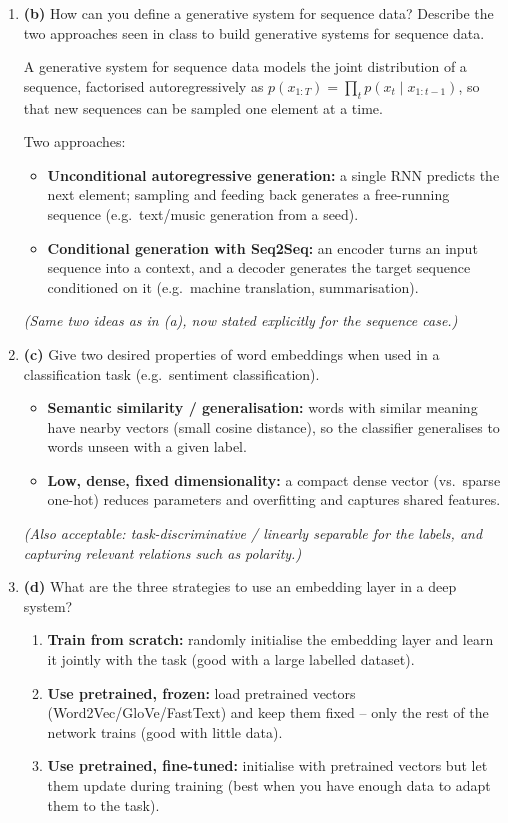 \documentclass[10pt,a4paper]{article}
\newcommand{\q}[1]{\item #1}
\begin{document}
\begin{enumerate}[leftmargin=*,label=\textbf{Q\arabic*.}]
\q \textbf{(b)} How can you define a generative system for sequence data? Describe the two approaches seen in class to build generative systems for sequence data.
\begin{answerbox}
A generative system for sequence data models the joint distribution of a sequence, factorised autoregressively as $p(x_{1:T})=\prod_t p(x_t\mid x_{1:t-1})$, so that new sequences can be sampled one element at a time.

Two approaches:
\begin{itemize}[leftmargin=*,nosep]
\item \textbf{Unconditional autoregressive generation:} a single RNN predicts the next element; sampling and feeding back generates a free-running sequence (e.g.\ text/music generation from a seed).
\item \textbf{Conditional generation with Seq2Seq:} an encoder turns an input sequence into a context, and a decoder generates the target sequence conditioned on it (e.g.\ machine translation, summarisation).
\end{itemize}
\textit{(Same two ideas as in (a), now stated explicitly for the sequence case.)}
\end{answerbox}

\q \textbf{(c)} Give two desired properties of word embeddings when used in a classification task (e.g.\ sentiment classification).
\begin{answerbox}
\begin{itemize}[leftmargin=*,nosep]
\item \textbf{Semantic similarity / generalisation:} words with similar meaning have nearby vectors (small cosine distance), so the classifier generalises to words unseen with a given label.
\item \textbf{Low, dense, fixed dimensionality:} a compact dense vector (vs.\ sparse one-hot) reduces parameters and overfitting and captures shared features.
\end{itemize}
\textit{(Also acceptable: task-discriminative / linearly separable for the labels, and capturing relevant relations such as polarity.)}
\end{answerbox}

\q \textbf{(d)} What are the three strategies to use an embedding layer in a deep system?
\begin{answerbox}
\begin{enumerate}[leftmargin=*,nosep,label=\arabic*.]
\item \textbf{Train from scratch:} randomly initialise the embedding layer and learn it jointly with the task (good with a large labelled dataset).
\item \textbf{Use pretrained, frozen:} load pretrained vectors (Word2Vec/GloVe/FastText) and keep them fixed -- only the rest of the network trains (good with little data).
\item \textbf{Use pretrained, fine-tuned:} initialise with pretrained vectors but let them update during training (best when you have enough data to adapt them to the task).
\end{enumerate}
\end{answerbox}


\end{enumerate}
\end{document}
